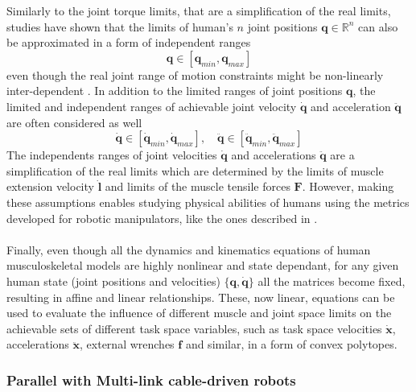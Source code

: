 Similarly to the joint torque limits, that are a simplification of the real limits, studies have shown that the limits of human's $n$ joint positions $\bm{q} \in \mathbb{R}^n$ can also be approximated in a form of independent ranges \cite{SOUCIE2011}
\begin{equation}
    \bm{q} \in  [\bm{q}_{min}, \bm{q}_{max} ]
    \label{eq:human_js_pos_range}
\end{equation}
even though the real joint range of motion constraints might be non-linearly inter-dependent \cite{Kane2014}.
In addition to the limited ranges of joint positions $\bm{q}$, the limited and independent ranges of achievable joint velocity $\dot{\bm{q}}$ and acceleration $\ddot{\bm{q}}$ are often considered as well \cite{Grimmer2020}
\begin{equation}
    \dot{\bm{q}} \in  [\dot{\bm{q}}_{min}, \dot{\bm{q}}_{max} ], \quad \ddot{\bm{q}} \in  [\ddot{\bm{q}}_{min}, \ddot{\bm{q}}_{max} ]
    \label{eq:human_js_vel_lim}
\end{equation}
The independents ranges of joint velocities $\dot{\bm{q}}$ and accelerations $\ddot{\bm{q}}$ are a simplification of the real limits which are determined by the limits of muscle extension velocity $\dot{\bm{l}}$ and limits of the muscle tensile forces $\bm{F}$. However, making these assumptions enables studying physical abilities of humans using the metrics developed for robotic manipulators, like the ones described in . 



\paragraph*{} Finally, even though all the dynamics and kinematics equations of human musculoskeletal models are highly nonlinear and state dependant, for any given human state (joint positions and velocities) $\{\bm{q},\dot{\bm{q}}\}$ all the matrices become fixed, resulting in affine and linear relationships. 
These, now linear, equations can be used to evaluate the influence of different muscle and joint space limits on the achievable sets of different task space variables, such as task space velocities $\dot{\bm{x}}$, accelerations $\ddot{\bm{x}}$,  external wrenches $\bm{f}$ and similar, in a form of convex polytopes. 


\subsubsection{Parallel with Multi-link cable-driven robots}

